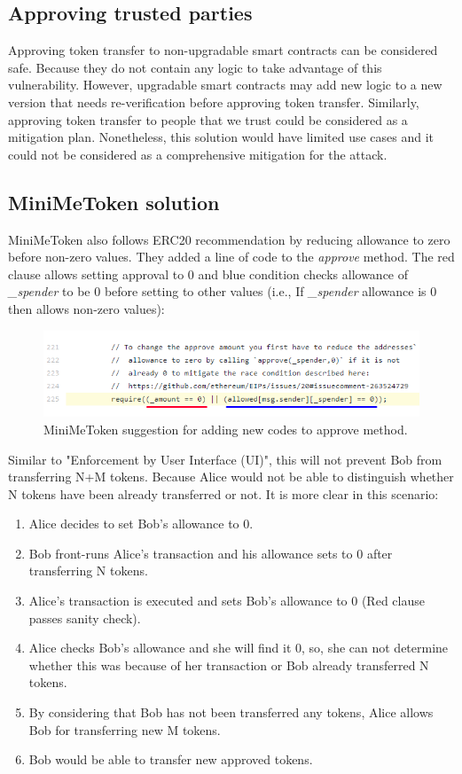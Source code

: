 \subsection{Approving trusted parties}
Approving token transfer to non-upgradable smart contracts can be considered safe. Because they do not contain any logic to take advantage of this vulnerability. However, upgradable smart contracts may add new logic to a new version that needs re-verification before approving token transfer. Similarly, approving token transfer to people that we trust could be considered as a mitigation plan. Nonetheless, this solution would have limited use cases and it could not be considered as a comprehensive mitigation for the attack.

\subsection{MiniMeToken solution}
MiniMeToken\cite{Ref15} also follows ERC20 recommendation by reducing allowance to zero before non-zero values. They added a line of code to the \textit{approve} method. The red clause allows setting approval to 0 and blue condition checks allowance of \textit{\_spender} to be 0 before setting to other values (i.e., If \textit{\_spender} allowance is 0 then allows non-zero values):
\begin{figure}[H]
	\centering
	\includegraphics[width=1.0\linewidth]{figures/multiple_withdrawal_06.png}
	\caption{MiniMeToken suggestion for adding new codes to approve method.}
\end{figure}
\noindent Similar to "Enforcement by User Interface (UI)", this will not prevent Bob from transferring N+M tokens. Because Alice would not be able to distinguish whether N tokens have been already transferred or not. It is more clear in this scenario:
\begin{enumerate}
	\item Alice decides to set Bob’s allowance to 0.
	\item Bob front-runs Alice’s transaction and his allowance sets to 0 after transferring N tokens.
	\item Alice’s transaction is executed and sets Bob’s allowance to 0 (Red clause passes sanity check).
	\item Alice checks Bob’s allowance and she will find it 0, so, she can not determine whether this was because of her transaction or Bob already transferred N tokens.
	\item By considering that Bob has not been transferred any tokens, Alice allows Bob for transferring new M tokens.
	\item Bob would be able to transfer new approved tokens.
\end{enumerate}

